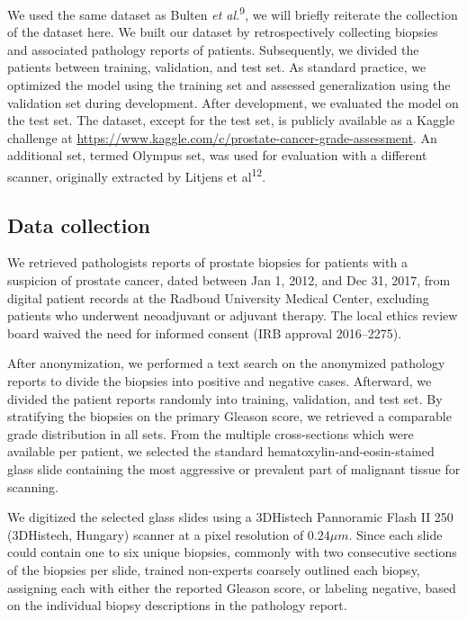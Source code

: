 \documentclass[
  12pt,
  a5,margin=2cmpaper,
]{article}
\begin{document}
We used the same dataset as Bulten \emph{et al.}\textsuperscript{9}, we
will briefly reiterate the collection of the dataset here. We built our
dataset by retrospectively collecting biopsies and associated pathology
reports of patients. Subsequently, we divided the patients between
training, validation, and test set. As standard practice, we optimized
the model using the training set and assessed generalization using the
validation set during development. After development, we evaluated the
model on the test set. The dataset, except for the test set, is publicly
available as a Kaggle challenge at
\url{https://www.kaggle.com/c/prostate-cancer-grade-assessment}. An
additional set, termed Olympus set, was used for evaluation with a
different scanner, originally extracted by Litjens et
al\textsuperscript{12}.

\hypertarget{data-collection}{%
\subsection{Data collection}\label{data-collection}}

We retrieved pathologists reports of prostate biopsies for patients with
a suspicion of prostate cancer, dated between Jan 1, 2012, and Dec 31,
2017, from digital patient records at the Radboud University Medical
Center, excluding patients who underwent neoadjuvant or adjuvant
therapy. The local ethics review board waived the need for informed
consent (IRB approval 2016--2275).

After anonymization, we performed a text search on the anonymized
pathology reports to divide the biopsies into positive and negative
cases. Afterward, we divided the patient reports randomly into training,
validation, and test set. By stratifying the biopsies on the primary
Gleason score, we retrieved a comparable grade distribution in all sets.
From the multiple cross-sections which were available per patient, we
selected the standard hematoxylin-and-eosin-stained glass slide
containing the most aggressive or prevalent part of malignant tissue for
scanning.

We digitized the selected glass slides using a 3DHistech Pannoramic
Flash II 250 (3DHistech, Hungary) scanner at a pixel resolution of
\(0.24 \mu m\). Since each slide could contain one to six unique
biopsies, commonly with two consecutive sections of the biopsies per
slide, trained non-experts coarsely outlined each biopsy, assigning each
with either the reported Gleason score, or labeling negative, based on
the individual biopsy descriptions in the pathology report.
\end{document}
